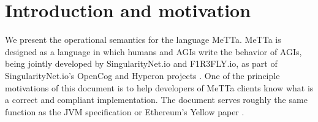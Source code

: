 \section{Introduction and motivation}
We present the operational semantics for the language MeTTa. MeTTa is designed as a language in which humans and AGIs write the behavior of AGIs, being jointly developed by SingularityNet.io and F1R3FLY.io, as part of SingularityNet.io's OpenCog and Hyperon projects \cite{DBLP:conf/agi/HartG08} \cite{YT:GoertzelIklePotapovHyperon2022}. One of the principle motivations of this document is to help developers of MeTTa clients know what is a correct and compliant implementation. The document serves roughly the same function as the JVM specification or Ethereum's Yellow paper \cite{wood2014ethereum}.
